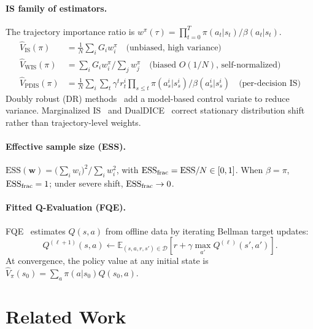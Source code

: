 \documentclass[10pt]{article}
\theoremstyle{plain}
\theoremstyle{definition}
\theoremstyle{remark}
\newcommand{\E}{\mathbb{E}}
\newcommand{\ESS}{\mathrm{ESS}}
\newcommand{\calD}{\mathcal{D}}
\begin{document}
\paragraph{IS family of estimators.}
The trajectory importance ratio is
$w^\pi(\tau)=\prod_{t=0}^T \pi(a_t|s_t)/\beta(a_t|s_t)$.
\begin{align}
  \hat{V}_{\mathrm{IS}}(\pi) &= \tfrac{1}{N}\textstyle\sum_i G_i w_i^\pi
  \quad\text{(unbiased, high variance)}\label{eq:is}\\
  \hat{V}_{\mathrm{WIS}}(\pi) &= \textstyle\sum_i G_i w_i^\pi \big/ \sum_j w_j^\pi
  \quad\text{(biased $O(1/N)$, self-normalized)}\label{eq:wis}\\
  \hat{V}_{\mathrm{PDIS}}(\pi) &= \tfrac{1}{N}\textstyle\sum_i \sum_t \gamma^t r_t^i \textstyle\prod_{s\leq t}\pi(a_s^i|s_s^i)/\beta(a_s^i|s_s^i)
  \quad\text{(per-decision IS)}\label{eq:pdis}
\end{align}
Doubly robust (DR) methods~\citep{jiang2016doubly,dudik2011doubly} add a
model-based control variate to reduce variance.  Marginalized IS~\citep{xie2019towards}
and DualDICE~\citep{nachum2019dualdice} correct stationary distribution
shift rather than trajectory-level weights.

\paragraph{Effective sample size (ESS).}
$\ESS(\mathbf{w}) = \bigl(\sum_i w_i\bigr)^2 \big/ \sum_i w_i^2$,
with $\ESS_{\rm frac}=\ESS/N\in[0,1]$.  When $\beta=\pi$,
$\ESS_{\rm frac}=1$; under severe shift, $\ESS_{\rm frac}\to 0$.

\paragraph{Fitted Q-Evaluation (FQE).}
FQE~\citep{ernst2005tree} estimates $Q(s,a)$ from offline data by iterating
Bellman target updates:
\begin{equation}
  Q^{(\ell+1)}(s,a) \leftarrow
  \E_{(s,a,r,s')\in\calD}\!\left[r + \gamma\max_{a'}Q^{(\ell)}(s',a')\right].
  \label{eq:fqe}
\end{equation}
At convergence, the policy value at any initial state is
$\hat{V}_\pi(s_0)=\sum_a\pi(a|s_0)Q(s_0,a)$.

\section{Related Work}
\label{sec:related}
\end{document}
